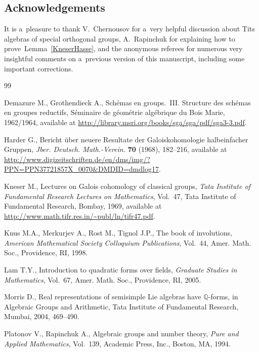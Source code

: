\documentclass[pdftex]{sigma}
\numberwithin{equation}{section}
\begin{document}
\subsection*{Acknowledgements}
It is a~pleasure to thank V.~Chernousov for a~very helpful discussion about Tits algebras of special orthogonal groups,
A.~Rapinchuk for explaining how to prove~Lemma~\ref{KneserHasse}, and the anonymous referees for numerous very insightful
comments on a~previous version of this manuscript, inclu\-ding some important corrections.

\begin{thebibliography}{99}
\footnotesize\itemsep=0pt

Demazure M., Grothendieck A., Sch\'emas en groups.~III. Structure des sch\'emas
  en groupes reductifs, S\'eminaire de g\'eom\'etrie alg\'ebrique du {B}ois
  {M}arie, 1962/1964, available at
  \url{http://library.msri.org/books/sga/sga/pdf/sga3-3.pdf}.

Harder G., Bericht \"uber neuere {R}esultate der {G}aloiskohomologie
  halbeinfacher {G}ruppen, \textit{Jber. Deutsch. Math.-Verein.} \textbf{70}
  (1968), 182--216, available at
  \url{http://www.digizeitschriften.de/en/dms/img/?PPN=PPN37721857X_0070&DMDID=dmdlog17}.

Kneser M., Lectures on {G}alois cohomology of classical groups, \textit{Tata
  Institute of Fundamental Research Lectures on Mathematics}, Vol.~47, Tata
  Institute of Fundamental Research, Bombay, 1969, available at
  \url{http://www.math.tifr.res.in/~publ/ln/tifr47.pdf}.

Knus M.A., Merkurjev A., Rost M., Tignol J.P., The book of involutions,
  \textit{American Mathematical Society Colloquium Publications}, Vol.~44,
  Amer. Math. Soc., Providence, RI, 1998.

Lam T.Y., Introduction to quadratic forms over f\/ields, \textit{Graduate Studies
  in Mathematics}, Vol.~67, Amer. Math. Soc., Providence, RI, 2005.

Morris D., Real representations of semisimple {L}ie algebras have {${\mathbb
  Q}$}-forms, in Algebraic Groups and Arithmetic, Tata Institute of Fundamental
  Research, Mumbai, 2004, 469--490.

Platonov V., Rapinchuk A., Algebraic groups and number theory, \textit{Pure and
  Applied Mathematics}, Vol.~139, Academic Press, Inc., Boston, MA, 1994.


\end{thebibliography}
\end{document}
